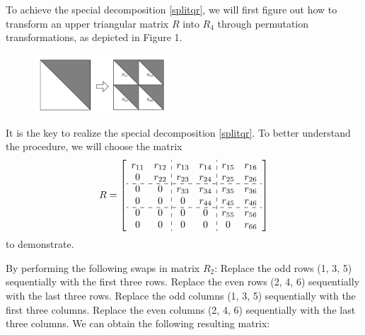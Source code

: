 \documentclass[12pt]{article}
\numberwithin{equation}{section} %
\begin{document}
To achieve the special decomposition \eqref{splitqr},  we will first figure out how to transform an upper triangular matrix $R$ into $R_4$ through permutation transformations, as depicted in Figure 1.
\begin{figure}[htbp]
        \centering
        \includegraphics[width=0.45\textwidth]{Upper triangular.png} %
         \label{fig:Upper triangular}
\end{figure}
 It is the key to realize the special decomposition \eqref{splitqr}. To better understand the procedure, we will choose the matrix 
\[R= \begin{bmatrix}
\begin{array}{cc:cc:cc}
 r_{11} & r_{12} & r_{13} & r_{14} & r_{15} & r_{16}\\
 0 & r_{22} & r_{23} & r_{24} & r_{25} & r_{26}\\
 \cdashline{1-6}
 0      & 0      & r_{33} & r_{34} & r_{35} & r_{36}\\
 0      & 0      & 0 & r_{44} & r_{45} & r_{46}\\
 \cdashline{1-6}
 0      & 0      & 0      & 0      & r_{55} & r_{56}\\
 0      & 0      & 0      & 0      & 0 & r_{66}\\
\end{array}
\end{bmatrix}
\]
to demonstrate. 

By performing the following swaps in matrix $R_2$: Replace the odd rows (1, 3, 5) sequentially with the first three rows. Replace the even rows (2, 4, 6) sequentially with the last three rows. Replace the odd columns (1, 3, 5) sequentially with the first three columns. Replace the even columns (2, 4, 6) sequentially with the last three columns. We can obtain the following  resulting matrix:
\end{document}
